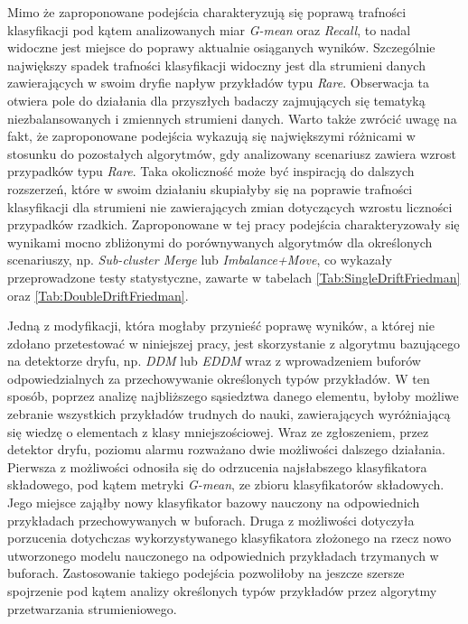 Mimo że zaproponowane podejścia charakteryzują się poprawą trafności klasyfikacji pod kątem analizowanych miar \textit{G-mean} oraz \textit{Recall}, to nadal widoczne jest miejsce do poprawy aktualnie osiąganych wyników. Szczególnie największy spadek trafności klasyfikacji widoczny jest dla strumieni danych zawierających w swoim dryfie napływ przykładów typu \textit{Rare}. Obserwacja ta otwiera pole do działania dla przyszłych badaczy zajmujących się tematyką niezbalansowanych i zmiennych strumieni danych. Warto także zwrócić uwagę na fakt, że zaproponowane podejścia wykazują się największymi różnicami w stosunku do pozostałych algorytmów, gdy analizowany scenariusz zawiera wzrost przypadków typu \textit{Rare}. Taka okoliczność może być inspiracją do dalszych rozszerzeń, które w swoim działaniu skupiałyby się na poprawie trafności klasyfikacji dla strumieni nie zawierających zmian dotyczących wzrostu liczności przypadków rzadkich. Zaproponowane w tej pracy podejścia charakteryzowały się wynikami mocno zbliżonymi do porównywanych algorytmów dla określonych scenariuszy, np. \textit{Sub-cluster Merge} lub \textit{Imbalance+Move}, co wykazały przeprowadzone testy statystyczne, zawarte w tabelach \ref{Tab:SingleDriftFriedman} oraz \ref{Tab:DoubleDriftFriedman}.

Jedną z modyfikacji, która mogłaby przynieść poprawę wyników, a której nie zdołano przetestować w niniejszej pracy, jest skorzystanie z algorytmu bazującego na detektorze dryfu, np. \textit{DDM} lub \textit{EDDM} wraz z wprowadzeniem buforów odpowiedzialnych za przechowywanie określonych typów przykładów. W ten sposób, poprzez analizę najbliższego sąsiedztwa danego elementu, byłoby możliwe zebranie wszystkich przykładów trudnych do nauki, zawierających wyróżniającą się wiedzę o elementach z klasy mniejszościowej. Wraz ze zgłoszeniem, przez detektor dryfu, poziomu alarmu rozważano dwie możliwości dalszego działania. Pierwsza z możliwości odnosiła się do odrzucenia najsłabszego klasyfikatora składowego, pod kątem metryki \textit{G-mean}, ze zbioru klasyfikatorów składowych. Jego miejsce zająłby nowy klasyfikator bazowy nauczony na odpowiednich przykładach przechowywanych w buforach. Druga z możliwości dotyczyła porzucenia dotychczas wykorzystywanego klasyfikatora złożonego na rzecz nowo utworzonego modelu nauczonego na odpowiednich przykładach trzymanych w buforach. Zastosowanie takiego podejścia pozwoliłoby na jeszcze szersze spojrzenie pod kątem analizy określonych typów przykładów przez algorytmy przetwarzania strumieniowego.

\newpage\null\thispagestyle{empty}\newpage